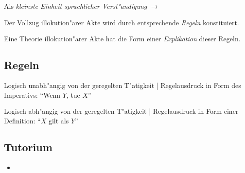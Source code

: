 \documentclass[emulatestandardclasses]{scrartcl}
\begin{document}
\begin{description}[leftmargin=!,labelwidth=\widthof{\bfseries Illokution"arer Akt}]
    \item[Illokution"arer Akt] Als \emph{kleinste Einheit sprachlicher Verst"andigung} $\rightarrow$ 
    \item[These] Der Vollzug illokution"arer Akte wird durch entsprechende \emph{Regeln} konstituiert. 
    \item[Idee] Eine Theorie illokution"arer Akte hat die Form einer \emph{Explikation} dieser Regeln. 
\end{description}

\subsection{Regeln}

\begin{description}[leftmargin=!,labelwidth=\widthof{\bfseries Konstitutive Regel}]
    \item[Regulative Regel] Logisch unabh"angig von der geregelten T"atigkeit | Regelausdruck in Form des Imperativs: "`Wenn $Y$, tue $X$"'
    \item[Konstitutive Regel] Logisch abh"angig von der geregelten T"atigkeit | Regelausdruck in Form einer Definition:  "`$X$ gilt als $Y$"'
\end{description}

\subsection{Tutorium}


\begin{itemize}
  \item 
\end{itemize}


\newpage
%
%

\end{document}
